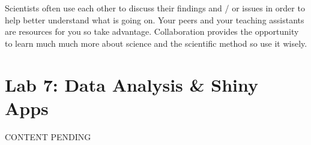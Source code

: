 \documentclass[
]{book}
\begin{document}
Scientists often use each other to discuss their findings and / or issues in order to help better understand what is going on. Your peers and your teaching assistants are resources for you so take advantage. Collaboration provides the opportunity to learn much much more about science and the scientific method so use it wisely.

\hypertarget{lab-7-data-analysis-shiny-apps}{%
\chapter*{Lab 7: Data Analysis \& Shiny Apps}\label{lab-7-data-analysis-shiny-apps}}

CONTENT PENDING
\end{document}
